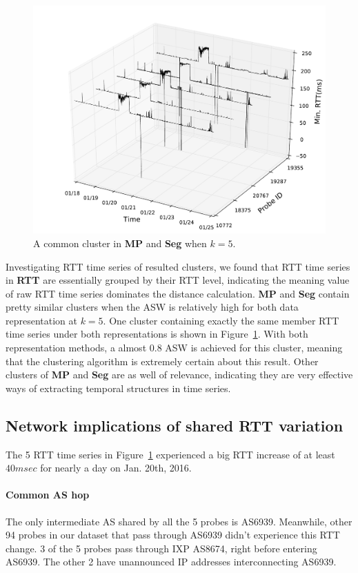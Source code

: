 \begin{figure}[!htb]
\centering
\includegraphics[width=.9\textwidth]{gfx/chap3/rtt3d_mp_cls2.pdf}
\caption{A common cluster in \textbf{MP} and \textbf{Seg} when $k=5$.}
\label{fig:rtt3d_mp_cls2}
\end{figure}

Investigating RTT time series of resulted clusters, we found that RTT time series in \textbf{RTT} are essentially grouped by their RTT level, indicating the meaning value of raw RTT time series dominates the distance calculation. \textbf{MP} and \textbf{Seg} contain pretty similar clusters when the \ac{ASW} is relatively high for both data representation at $k=5$. One cluster containing exactly the same member RTT time series under both representations is shown in Figure~\ref{fig:rtt3d_mp_cls2}. With both representation methods, a almost 0.8 \ac{ASW} is achieved for this cluster, meaning that the clustering algorithm is extremely certain about this result. Other clusters of \textbf{MP} and \textbf{Seg} are as well of relevance, indicating they are very effective ways of extracting temporal structures in time series.

\subsection{Network implications of shared RTT variation}

The 5 RTT time series in Figure~\ref{fig:rtt3d_mp_cls2} experienced a big RTT increase of at least $40msec$ for nearly a day on Jan. 20th, 2016.

\paragraph*{Common AS hop} The only intermediate AS shared by all the 5 probes is AS6939.
Meanwhile, other 94 probes in our dataset that pass through AS6939 didn't experience this RTT change.
3 of the 5 probes pass through IXP AS8674, right before entering AS6939.
The other 2 have unannounced IP addresses interconnecting AS6939.


